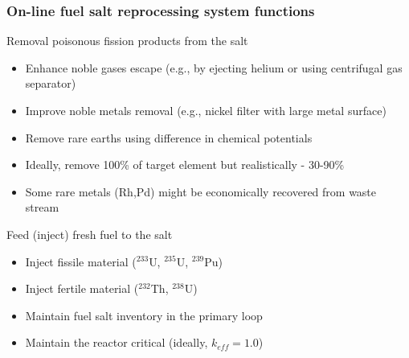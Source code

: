 \begin{frame}
\frametitle{On-line fuel salt reprocessing system functions}
\begin{block}{Removal poisonous fission products from the salt}
	\begin{itemize}
		\item Enhance noble gases escape (e.g., by ejecting helium or using centrifugal gas separator)
		\item Improve noble metals removal (e.g., nickel filter with large metal surface)
		\item Remove rare earths using difference in chemical potentials
		\item Ideally, remove 100\% of target element but realistically - 
		30-90\%
		\item Some rare metals (Rh,Pd) might be economically recovered from waste stream %
	\end{itemize}
\end{block}

\begin{block}{Feed (inject) fresh fuel to the salt}
	\begin{itemize}
		\item Inject fissile material ($^{233}$U, $^{235}$U, $^{239}$Pu)
		\item Inject fertile material ($^{232}$Th, $^{238}$U)
		\item Maintain fuel salt inventory in the primary loop
		\item Maintain the reactor critical (ideally, $k_{eff}=1.0$)
	\end{itemize}
\end{block}

\end{frame}


